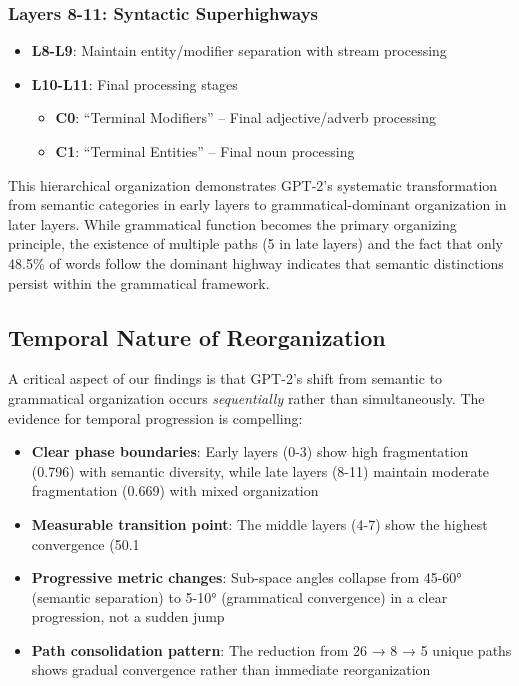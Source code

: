 \subsubsection{Layers 8-11: Syntactic Superhighways}
\begin{itemize}
    \item \textbf{L8-L9}: Maintain entity/modifier separation with stream processing
    \item \textbf{L10-L11}: Final processing stages
    \begin{itemize}
        \item \textbf{C0}: ``Terminal Modifiers'' -- Final adjective/adverb processing
        \item \textbf{C1}: ``Terminal Entities'' -- Final noun processing
    \end{itemize}
\end{itemize}

This hierarchical organization demonstrates GPT-2's systematic transformation from semantic categories in early layers to grammatical-dominant organization in later layers. While grammatical function becomes the primary organizing principle, the existence of multiple paths (5 in late layers) and the fact that only 48.5\% of words follow the dominant highway indicates that semantic distinctions persist within the grammatical framework.

\subsection{Temporal Nature of Reorganization}

A critical aspect of our findings is that GPT-2's shift from semantic to grammatical organization occurs \textit{sequentially} rather than simultaneously. The evidence for temporal progression is compelling:

\begin{itemize}
    \item \textbf{Clear phase boundaries}: Early layers (0-3) show high fragmentation (0.796) with semantic diversity, while late layers (8-11) maintain moderate fragmentation (0.669) with mixed organization
    \item \textbf{Measurable transition point}: The middle layers (4-7) show the highest convergence (50.1%
    \item \textbf{Progressive metric changes}: Sub-space angles collapse from 45-60° (semantic separation) to 5-10° (grammatical convergence) in a clear progression, not a sudden jump
    \item \textbf{Path consolidation pattern}: The reduction from 26 → 8 → 5 unique paths shows gradual convergence rather than immediate reorganization
\end{itemize}

